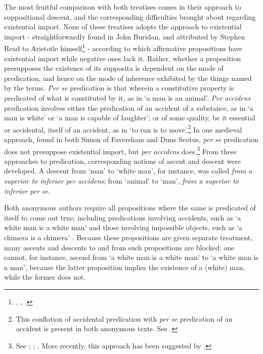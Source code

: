 \documentclass[]{birkjour}
\begin{document}
The most fruitful comparison with both treatises comes in their approach to suppositional descent, and the corresponding difficulties brought about regarding existential import. None of these treatises adopts the approach to existential import - straightforwardly found in John Buridan, and  attributed by Stephen Read to Aristotle himself\footnote{\autocite[q. I. 38]{BuridanPostAn}, \autocite{Klima2001}, \autocite{Read2015b}.} - according to which affirmative propositions have existential import while negative ones lack it. Rather, whether a proposition presupposes the existence of its supposita is dependent on the mode of predication, and hence on the mode of inherence exhibited by the things named by the terms. \textit{Per se} predication is that wherein a constitutive property is predicated of what is constituted by it, as in `a man is an animal'. \textit{Per accidens} predication involves either the predication of an accident of a substance, as in `a man is white' or `a man is capable of laughter'; or of some quality, be it essential or accidental, itself of an accident, as in `to run is to move'.\footnote{This conflation of accidental predication with \textit{per se} predication of an accident is present in both anonymous texts. See \autocite[pp. 10-11, par. 35-36; 25, par. 66]{Green-Pedersen1980a}.} In one medieval approach, found in both Simon of Faversham and Duns Scotus, \textit{per se} predication does not presuppose existential import, but \textit{per accidens} does.\footnote{See \autocite[q. I. 56]{FavershamQE}; \autocite[I. qq. 5-8. par. 49, 74]{ScotusPeriHerm}; \autocite[q. 11, par. 19]{ScotusQE}. More recently, this approach has been suggested by \autocite{CIFOL1}.} From these approaches to predication, corresponding notions of ascent and descent were developed. A descent from `man' to `white man', for instance, was called \textit{from a superior to inferior per accidens}; from `animal' to `man', \textit{from a superior to inferior per se}. 
	
Both anonymous authors require all propositions where the same is predicated of itself to come out true, including predications involving accidents, such as `a white man is a white man' and those involving impossible objects, such as `a chimera is a chimera' \autocite[p. 8, par. 23; p. 11, par. 36-37; p. 18, par. 31-32]{Green-Pedersen1980a}. Because these propositions are given separate treatment, many ascents and descents to and from such propositions are blocked: one cannot, for instance, ascend from `a white man is a white man' to `a white man is a man', because the latter proposition implies the existence of a (white) man, while the former does not. 
	
\end{document}
